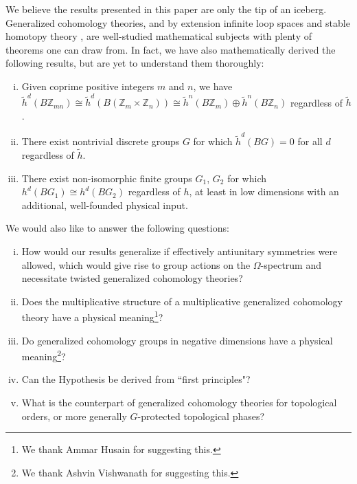 \documentclass[sort&compress]{elsarticle}
\theoremstyle{theoremstyle}
\theoremstyle{framedtheoremstyle}
\theoremstyle{definitionstyle}
\theoremstyle{definitionstyle}
\theoremstyle{definitionstyle}
\theoremstyle{definitionstyle}
\theoremstyle{nameddefinitionstyle}
\theoremstyle{framednameddefinitionstyle}
\theoremstyle{proofstyle}
\theoremstyle{definitionstyle}
\newcommand{\ZZZ}{\mathbb{Z}}
\newcommand{\isomorphic}{\cong}
\newcommand{\paren}[1]{\left( #1 \right)}
\begin{document}
We believe the results presented in this paper are only the tip of an iceberg.
Generalized cohomology theories, and by extension infinite loop spaces and stable homotopy theory \cite{Adams1, Adams2}, are well-studied mathematical subjects with plenty of theorems one can draw from.
In fact, we have also mathematically derived the following results, but are yet to understand them thoroughly:
\begin{enumerate}[(i)]
\item Given coprime positive integers $m$ and $n$, we have $\tilde h^d\paren{B\ZZZ_{mn}} \isomorphic \tilde h^d\paren{B\paren{\ZZZ_m \times \ZZZ_n}} \isomorphic \tilde h^n\paren{B\ZZZ_m} \oplus \tilde h^n \paren{B\ZZZ_n}$ regardless of $\tilde h$.

\item There exist nontrivial discrete groups $G$ for which $\tilde h^d\paren{BG} = 0$ for all $d$ regardless of $\tilde h$.

\item There exist non-isomorphic finite groups $G_1$, $G_2$ for which $h^d\paren{BG_1} \isomorphic h^d\paren{BG_2}$ regardless of $h$, at least in low dimensions with an additional, well-founded physical input.
\end{enumerate}
We would also like to answer the following questions:
\begin{enumerate}[(i)]
\item How would our results generalize if effectively antiunitary symmetries were allowed, which would give rise to group actions on the $\Omega$-spectrum and necessitate twisted generalized cohomology theories?

\item Does the multiplicative structure of a multiplicative generalized cohomology theory have a physical meaning\footnote{We thank Ammar Husain for suggesting this.}?

\item Do generalized cohomology groups in negative dimensions have a physical meaning\footnote{We thank Ashvin Vishwanath for suggesting this.}?

\item Can the Hypothesis be derived from ``first principles"?

\item What is the counterpart of generalized cohomology theories for topological orders, or more generally $G$-protected topological phases?
\end{enumerate}
\end{document}
